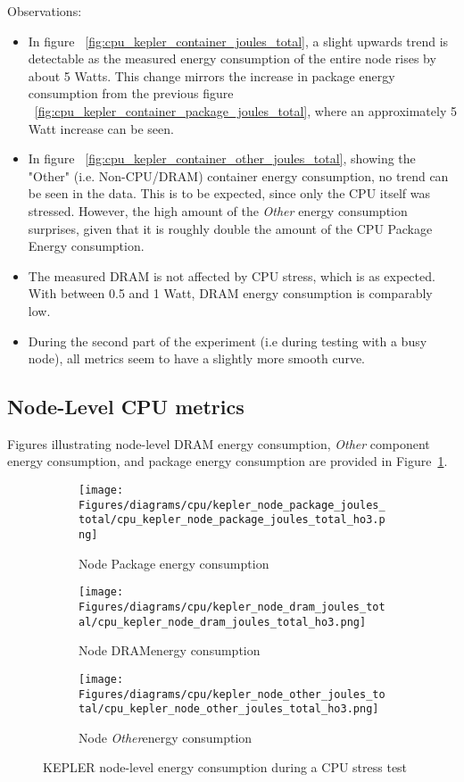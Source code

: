 Observations:
\begin{itemize}
\item In figure ~\ref{fig:cpu_kepler_container_joules_total}, a slight upwards trend is detectable as the measured energy consumption of the entire node rises by about 5 Watts. This change mirrors the increase in package energy consumption from the previous figure ~\ref{fig:cpu_kepler_container_package_joules_total}, where an approximately 5 Watt increase can be seen.
\item In figure ~\ref{fig:cpu_kepler_container_other_joules_total}, showing the "Other" (i.e. Non-CPU/DRAM) container energy consumption, no trend can be seen in the data. This is to be expected, since only the CPU itself was stressed. However, the high amount of the \textit{Other} energy consumption surprises, given that it is roughly double the amount of the CPU Package Energy consumption.
\item The measured DRAM is not affected by CPU stress, which is as expected. With between 0.5 and 1 Watt, DRAM energy consumption is comparably low.
\item During the second part of the experiment (i.e during testing with a busy node), all metrics seem to have a slightly more smooth curve.
\end{itemize}

\subsection{Node-Level CPU metrics}

Figures illustrating node-level DRAM energy consumption, \textit{Other} component energy consumption, and package energy consumption are provided in Figure~\ref{fig:cpu_kepler_node_package_joules_total}.

\begin{figure}[H]
    \centering
    \begin{subfigure}{1\textwidth}
        \texttt{[image: Figures/diagrams/cpu/kepler\_node\_package\_joules\_total/cpu\_kepler\_node\_package\_joules\_total\_ho3.png]}
        \caption{Node Package energy consumption}
        \label{fig:cpu_kepler_node_package_joules_total}
    \end{subfigure}
    \begin{subfigure}{0.49\textwidth}
        \texttt{[image: Figures/diagrams/cpu/kepler\_node\_dram\_joules\_total/cpu\_kepler\_node\_dram\_joules\_total\_ho3.png]}
        \caption{Node DRAMenergy consumption}
        \label{fig:cpu_kepler_node_dram_joules_total}
    \end{subfigure}
    \begin{subfigure}{0.49\textwidth}
        \texttt{[image: Figures/diagrams/cpu/kepler\_node\_other\_joules\_total/cpu\_kepler\_node\_other\_joules\_total\_ho3.png]}
        \caption{Node \textit{Other}energy consumption}
        \label{fig:cpu_kepler_node_other_joules_total}
    \end{subfigure}
    \caption[Node-Level Energy Consumption]{KEPLER node-level energy consumption during a CPU stress test}
\end{figure}


